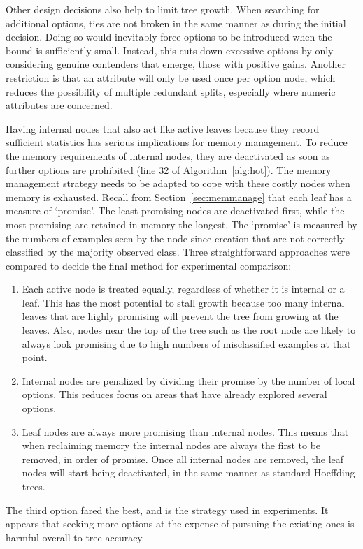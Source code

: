 Other design decisions also help to limit tree growth. When searching for additional options, ties are not broken in the same manner as during the initial decision. Doing so would inevitably force options to be introduced when the bound is sufficiently small. Instead, this cuts down excessive options by only considering genuine contenders that emerge, those with positive gains. Another restriction is that an attribute will only be used once per option node, which reduces the possibility of multiple redundant splits, especially where numeric attributes are concerned.

Having internal nodes that also act like active leaves because they record sufficient statistics has serious implications for memory management. To reduce the memory requirements of internal nodes, they are deactivated as soon as further options are prohibited (line 32 of Algorithm~\ref{alg:hot}). The memory management strategy needs to be adapted to cope with these costly nodes when memory is exhausted.
Recall from Section~\ref{sec:memmanage} that each leaf has a measure of `promise'. 
The least promising nodes are deactivated first, while the most promising are retained in memory the longest.
The `promise' is measured by the numbers of examples seen by the node since creation that are not correctly classified by the majority observed class.
Three straightforward approaches were compared to decide the final method for experimental comparison:
\begin{enumerate}
\item Each active node is treated equally, regardless of whether it is internal or a leaf. This has the most potential to stall growth because too many internal leaves that are highly promising will prevent the tree from growing at the leaves. Also, nodes near the top of the tree such as the root node are likely to always look promising due to high numbers of misclassified examples at that point.
\item Internal nodes are penalized by dividing their promise by the number of local options. This reduces focus on areas that have already explored several options.
\item Leaf nodes are always more promising than internal nodes. This means that when reclaiming memory the internal nodes are always the first to be removed, in order of promise. Once all internal nodes are removed, the leaf nodes will start being deactivated, in the same manner as standard Hoeffding trees.
\end{enumerate}
The third option fared the best, and is the strategy used in experiments. It appears that seeking more options at the expense of pursuing the existing ones is harmful overall to tree accuracy.

